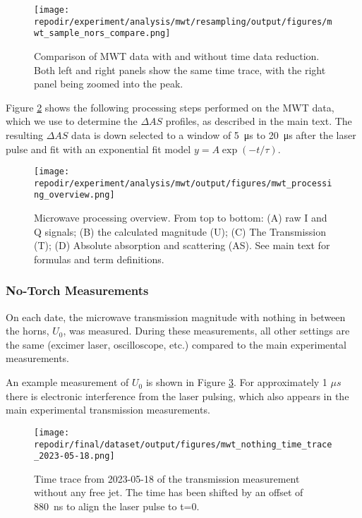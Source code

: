 \begin{figure}
\centering
\texttt{[image: \\repodir/experiment/analysis/mwt/resampling/output/figures/mwt\_sample\_nors\_compare.png]}
\caption{Comparison of MWT data with and without time data reduction. Both left and right panels show the same time trace, with the right panel being zoomed into the peak.}
\label{fig:SI_mwt_reduction}
\end{figure}

Figure \ref{fig:SI_mwt_processing_overview} shows the following processing steps performed on the MWT data, which we use to determine the $\Delta AS$ profiles, as described in the main text. The resulting $\Delta AS$ data is down selected to a window of \SI{5} {\micro\second} to \SI{20} {\micro\second} after the laser pulse and fit with an exponential fit model $y = A \exp(-t/\tau) $.


\begin{figure}[]
\centering
\texttt{[image: \\repodir/experiment/analysis/mwt/output/figures/mwt\_processing\_overview.png]}
\caption{Microwave processing overview. From top to bottom: (A) raw I and Q signals; (B) the calculated magnitude (U); (C) The Transmission (T); (D) Absolute absorption and scattering (AS). See main text for formulas and term definitions.  }
\label{fig:SI_mwt_processing_overview}
\end{figure}


\subsubsection{No-Torch Measurements} %
\label{sec:no_torch_measurements}

On each date, the microwave transmission magnitude with nothing in between the horns, $U_{0}$, was measured. During these measurements, all other settings are the same (excimer laser, oscilloscope, etc.) compared to the main experimental measurements.

An example measurement of $U_{0}$ is shown in Figure \ref{fig:SI_MWT_nothing_time_trace}. For approximately 1 $\mu s$ there is electronic interference from the laser pulsing, which also appears in the main experimental transmission measurements. 



\begin{figure}[]
\centering
\texttt{[image: \\repodir/final/dataset/output/figures/mwt\_nothing\_time\_trace\_2023-05-18.png]}
\caption{Time trace from 2023-05-18 of the transmission measurement without any free jet. The time has been shifted by an offset of \SI{880} {\nano\second} to align the laser pulse to t=0.}
\label{fig:SI_MWT_nothing_time_trace}
\end{figure}

